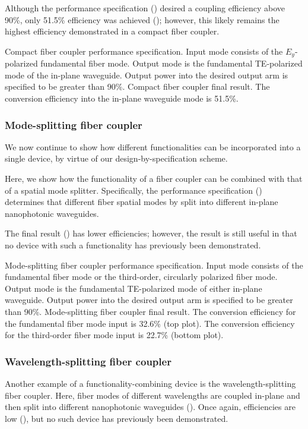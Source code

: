 \documentclass[letterpaper,10pt]{article}
\begin{document}
Although the performance specification ()
    desired a coupling efficiency above 90\%,
    only 51.5\% efficiency was achieved ();
    however, this likely remains the highest efficiency demonstrated
    in a compact fiber coupler.

    {Compact fiber coupler performance specification.
    Input mode consists of the $E_y$-polarized fundamental fiber mode.
    Output mode is the fundamental TE-polarized mode of the in-plane waveguide.
    Output power into the desired output arm is specified to be greater than 90\%.}
    {Compact fiber coupler final result.
    The conversion efficiency into the in-plane waveguide mode is 51.5\%.}

\subsubsection{Mode-splitting fiber coupler}
We now continue to show how different functionalities
    can be incorporated into a single device,
    by virtue of our design-by-specification scheme.

Here, we show how the functionality of a fiber coupler
    can be combined with that of a spatial mode splitter.
Specifically, the performance specification ()
    determines that different fiber spatial modes
    by split into different in-plane nanophotonic waveguides.

The final result () has lower efficiencies;
    however, the result is still useful 
    in that no device with such a functionality has previously been demonstrated.

    {Mode-splitting fiber coupler performance specification.
    Input mode consists of the fundamental fiber mode or 
        the third-order, circularly polarized fiber mode.
    Output mode is the fundamental TE-polarized mode of either in-plane waveguide.
    Output power into the desired output arm is specified to be greater than 90\%.}
    {Mode-splitting fiber coupler final result.
    The conversion efficiency for the fundamental fiber mode input is 32.6\% 
        (top plot).
    The conversion efficiency for the third-order fiber mode input is 22.7\% 
        (bottom plot).}

\subsubsection{Wavelength-splitting fiber coupler}
Another example of a functionality-combining device is the wavelength-splitting
    fiber coupler.
Here, fiber modes of different wavelengths are coupled in-plane
    and then split into different nanophotonic waveguides ().
Once again, efficiencies are low (),
    but no such device has previously been demonstrated.
\end{document}

